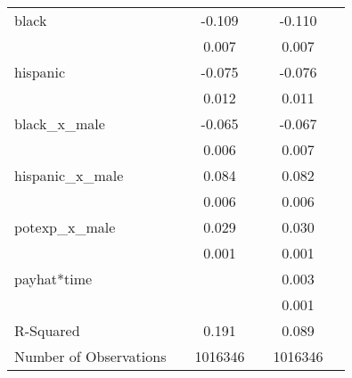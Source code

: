 \documentclass{article}
\begin{document}
\begin{table}[ht]
\begin{tabular}{llclcl}
black                  &  & -0.109    &            & -0.110   &  \\
                       &  & 0.007    &            & 0.007    &  \\
hispanic               &  & -0.075   &            & -0.076   &  \\
                       &  & 0.012     &            & 0.011    & \\
black\_x\_male         &  & -0.065   &            & -0.067    &  \\
                       &  & 0.006     &            & 0.007    &  \\
hispanic\_x\_male      &  & 0.084     &            & 0.082    &   \\
                       &  & 0.006    &            & 0.006    & \\
potexp\_x\_male        &  & 0.029     &            & 0.030    &    \\
                       &  & 0.001    &            & 0.001    & \\
payhat*time            &  &              &            & 0.003    & \\
                       &  &              &            & 0.001    &  \\
R-Squared              &  & 0.191      &            & 0.089       & \\
Number of Observations &  & 1016346      &            & 1016346      & \\
\hline
\end{tabular}
\end{table}
\end{document}
